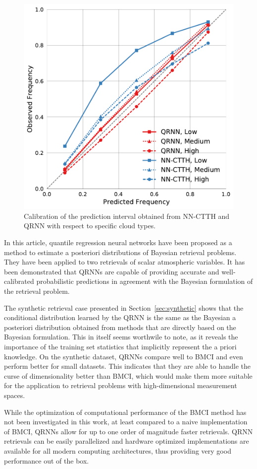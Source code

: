 \documentclass[journal abbreviation, manuscript]{copernicus}
\begin{document}
  \begin{figure}[hbpt!]
    \centering
    \includegraphics[width = 0.5\linewidth]{../plots/calibration_cloud_type}
    \caption{Calibration of the prediction interval obtained from NN-CTTH and QRNN
    with respect to specific cloud types.}
    \label{fig:calibration_cloud_type}
  \end{figure}


\conclusions  %
\label{sec:conclusions}

In this article, quantile regression neural networks have been proposed as a
method to estimate a posteriori distributions of Bayesian retrieval problems.
They have been applied to two retrievals of scalar atmospheric variables. It has
been demonstrated that QRNNs are capable of providing accurate and
well-calibrated probabilistic predictions in agreement with the Bayesian
formulation of the retrieval problem.

The synthetic retrieval case presented in Section~\ref{sec:synthetic} shows that
the conditional distribution learned by the QRNN is the same as the Bayesian a
posteriori distribution obtained from methods that are directly based on the
Bayesian formulation. This in itself seems worthwile to note, as it reveals the
importance of the training set statistics that implicitly represent the a priori
knowledge. On the synthetic dataset, QRNNs compare well to BMCI and even perform
better for small datasets. This indicates that they are able to handle the
curse of dimensionality better than BMCI, which would make them more suitable
for the application to retrieval problems with high-dimensional measurement
spaces.

While the optimization of computational performance of the BMCI method has not been
investigated in this work, at least compared to a naive implementation of BMCI,
QRNNs allow for up to one order of magnitude faster retrievals. QRNN retrievals
can be easily parallelized and hardware optimized implementations are available
for all modern computing architectures, thus providing very good performance out
of the box.
\end{document}
